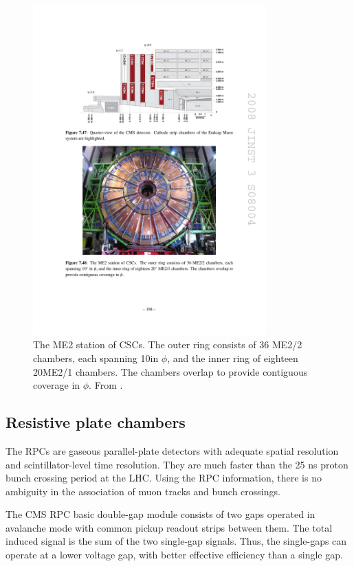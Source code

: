 \begin{figure}[hbtp]
\centering
\includegraphics[width=0.8\textwidth]{figures/cms_cscs_me2.pdf}
\caption{
The ME2 station of CSCs. The outer ring consists of 36 ME2/2 chambers, each
spanning 10\degree in $\phi$, and the inner ring of eighteen 20\degree ME2/1 chambers.
The chambers overlap to provide contiguous coverage in $\phi$.
From \cite{Chatrchyan:2008aa}.
}
\label{fig:cms_cscs_me2}
\end{figure}

\subsection{Resistive plate chambers}

The RPCs are gaseous parallel-plate detectors with adequate spatial resolution and scintillator-level time resolution.
They are much faster than the 25 ns proton bunch crossing period at the LHC.
Using the RPC information, there is no ambiguity in the association of muon tracks and bunch crossings.

The CMS RPC basic double-gap module consists of two gaps operated in avalanche mode with common
pickup readout strips between them.
The total induced signal is the sum of the two single-gap signals.
Thus, the single-gaps can operate at a lower voltage gap,
with better effective efficiency than a single gap.

